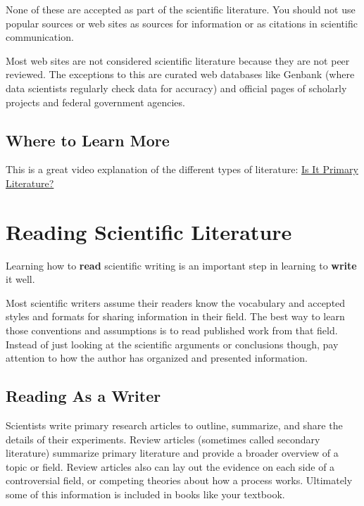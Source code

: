 \documentclass[
]{book}
\begin{document}
None of these are accepted as part of the scientific literature. You should not use popular sources or web sites as sources for information or as citations in scientific communication.

Most web sites are not considered scientific literature because they are not peer reviewed. The exceptions to this are curated web databases like Genbank (where data scientists regularly check data for accuracy) and official pages of scholarly projects and federal government agencies.

\hypertarget{where-to-learn-more}{%
\section{Where to Learn More}\label{where-to-learn-more}}

This is a great video explanation of the different types of literature: \href{https://www.youtube.com/watch?v=3o35J2QihJY}{Is It Primary Literature?}

\hypertarget{reading120}{%
\chapter{Reading Scientific Literature}\label{reading120}}

Learning how to \textbf{read} scientific writing is an important step in learning to \textbf{write} it well.

Most scientific writers assume their readers know the vocabulary and accepted styles and formats for sharing information in their field. The best way to learn those conventions and assumptions is to read published work from that field. Instead of just looking at the scientific arguments or conclusions though, pay attention to how the author has organized and presented information.

\hypertarget{reading-as-a-writer}{%
\section{Reading As a Writer}\label{reading-as-a-writer}}

Scientists write primary research articles to outline, summarize, and share the details of their experiments. Review articles (sometimes called secondary literature) summarize primary literature and provide a broader overview of a topic or field. Review articles also can lay out the evidence on each side of a controversial field, or competing theories about how a process works. Ultimately some of this information is included in books like your textbook.
\end{document}
